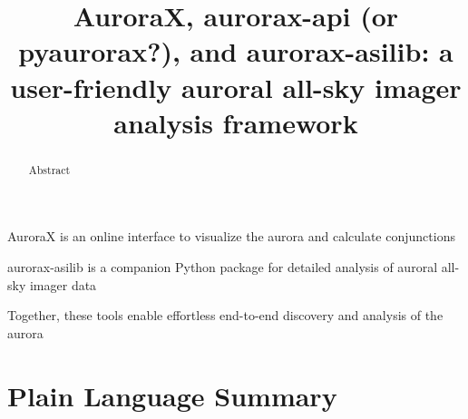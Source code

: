 \documentclass[draft]{agujournal2019}
\begin{document}
\title{AuroraX, aurorax-api (or pyaurorax?), and aurorax-asilib: a user-friendly auroral all-sky imager analysis framework}





\begin{keypoints}
\item AuroraX is an online interface to visualize the aurora and calculate conjunctions
\item aurorax-asilib is a companion Python package for detailed analysis of auroral all-sky imager data 
\item Together, these tools enable effortless end-to-end discovery and analysis of the aurora
\end{keypoints}


\begin{abstract}
Abstract
\end{abstract}


\section*{Plain Language Summary}
\noindent
\end{document}
